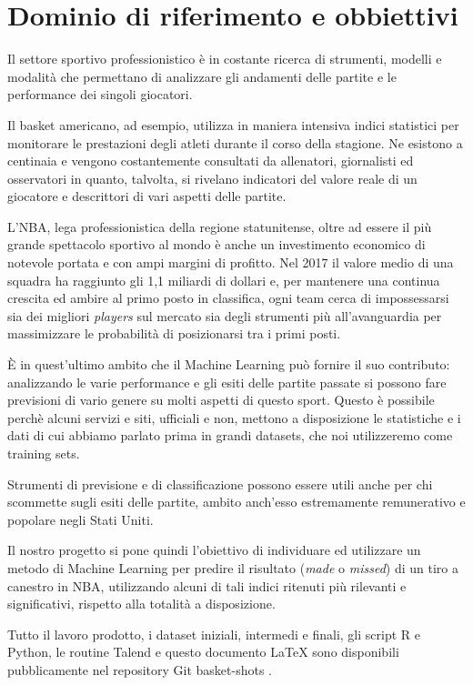 \section{Dominio di riferimento e obbiettivi}
Il settore sportivo professionistico è in costante ricerca di strumenti, modelli e modalità che permettano di analizzare gli andamenti delle partite e le performance dei singoli giocatori.

Il basket americano, ad esempio, utilizza in maniera intensiva indici statistici per monitorare le prestazioni degli atleti durante il corso della stagione. Ne esistono a centinaia e vengono costantemente consultati da allenatori, giornalisti ed osservatori in quanto, talvolta, si rivelano indicatori del valore reale di un giocatore e descrittori di vari aspetti delle partite.
\par
L’NBA, lega professionistica della regione statunitense, oltre ad essere il più grande spettacolo sportivo al mondo è anche un investimento economico di notevole portata e con ampi margini di profitto. Nel 2017 il valore medio di una squadra ha raggiunto gli 1,1 miliardi di dollari e, per mantenere una continua crescita ed ambire al primo posto in classifica, ogni team cerca di impossessarsi sia dei migliori \textit{players} sul mercato sia degli strumenti più all’avanguardia per massimizzare le probabilità di posizionarsi tra i primi posti.
\par
È in quest’ultimo ambito che il Machine Learning può fornire il suo contributo: analizzando le varie performance e gli esiti delle partite passate si possono fare previsioni di vario genere su molti aspetti di questo sport. 
Questo è possibile perchè alcuni servizi e siti, ufficiali e non, mettono a disposizione le statistiche e i dati di cui abbiamo parlato prima in grandi datasets, che noi utilizzeremo come training sets.
\par
Strumenti di previsione e di classificazione possono essere utili anche per chi scommette sugli esiti delle partite, ambito anch’esso estremamente remunerativo e popolare negli Stati Uniti.
\par
Il nostro progetto si pone quindi l'obiettivo di individuare ed utilizzare un metodo di Machine Learning per predire il risultato (\textit{made} o \textit{missed}) di un tiro a canestro in NBA, utilizzando alcuni di tali indici ritenuti più rilevanti e significativi, rispetto alla totalità a disposizione.
\par
Tutto il lavoro prodotto, i dataset iniziali, intermedi e finali, gli script R e Python, le routine Talend e questo documento \LaTeX{} sono disponibili pubblicamente nel repository Git basket-shots \cite{repo}.